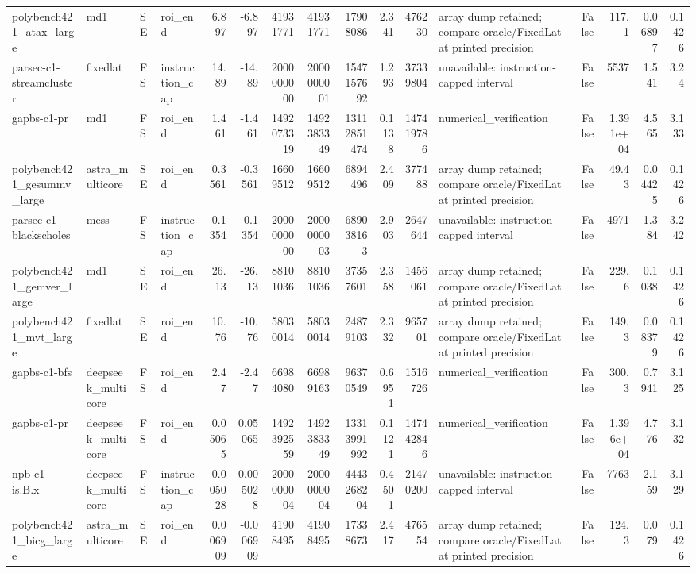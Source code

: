 \begin{tabular}{llllrrrrrrrlrrrr}
polybench421\_atax\_large & md1 & SE & roi\_end & 6.897 & -6.897 & 41931771 & 41931771 & 17908086 & 2.341 & 476230 & array dump retained; compare oracle/FixedLat at printed precision & False & 117.1 & 0.06897 & 0.1426 \\
parsec-c1-streamcluster & fixedlat & FS & instruction\_cap & 14.89 & -14.89 & 2000000000 & 2000000001 & 1547157692 & 1.293 & 37339804 & unavailable: instruction-capped interval & False & 5537 & 1.541 & 3.24 \\
gapbs-c1-pr & md1 & FS & roi\_end & 1.461 & -1.461 & 1492073319 & 1492383349 & 13112851474 & 0.1138 & 147419786 & numerical\_verification & False & 1.391e+04 & 4.565 & 3.133 \\
polybench421\_gesummv\_large & astra\_multicore & SE & roi\_end & 0.3561 & -0.3561 & 16609512 & 16609512 & 6894496 & 2.409 & 377488 & array dump retained; compare oracle/FixedLat at printed precision & False & 49.43 & 0.04425 & 0.1426 \\
parsec-c1-blackscholes & mess & FS & instruction\_cap & 0.1354 & -0.1354 & 2000000000 & 2000000003 & 689038163 & 2.903 & 2647644 & unavailable: instruction-capped interval & False & 4971 & 1.384 & 3.242 \\
polybench421\_gemver\_large & md1 & SE & roi\_end & 26.13 & -26.13 & 88101036 & 88101036 & 37357601 & 2.358 & 1456061 & array dump retained; compare oracle/FixedLat at printed precision & False & 229.6 & 0.1038 & 0.1426 \\
polybench421\_mvt\_large & fixedlat & SE & roi\_end & 10.76 & -10.76 & 58030014 & 58030014 & 24879103 & 2.332 & 965701 & array dump retained; compare oracle/FixedLat at printed precision & False & 149.3 & 0.08379 & 0.1426 \\
gapbs-c1-bfs & deepseek\_multicore & FS & roi\_end & 2.47 & -2.47 & 66984080 & 66989163 & 96370549 & 0.6951 & 1516726 & numerical\_verification & False & 300.3 & 0.7941 & 3.125 \\
gapbs-c1-pr & deepseek\_multicore & FS & roi\_end & 0.05065 & 0.05065 & 1492392559 & 1492383349 & 13313991992 & 0.1121 & 147442846 & numerical\_verification & False & 1.396e+04 & 4.776 & 3.132 \\
npb-c1-is.B.x & deepseek\_multicore & FS & instruction\_cap & 0.005028 & 0.005028 & 2000000004 & 2000000004 & 4443268204 & 0.4501 & 21470200 & unavailable: instruction-capped interval & False & 7763 & 2.159 & 3.129 \\
polybench421\_bicg\_large & astra\_multicore & SE & roi\_end & 0.006909 & -0.006909 & 41908495 & 41908495 & 17338673 & 2.417 & 476554 & array dump retained; compare oracle/FixedLat at printed precision & False & 124.3 & 0.079 & 0.1426 \\

\end{tabular}
